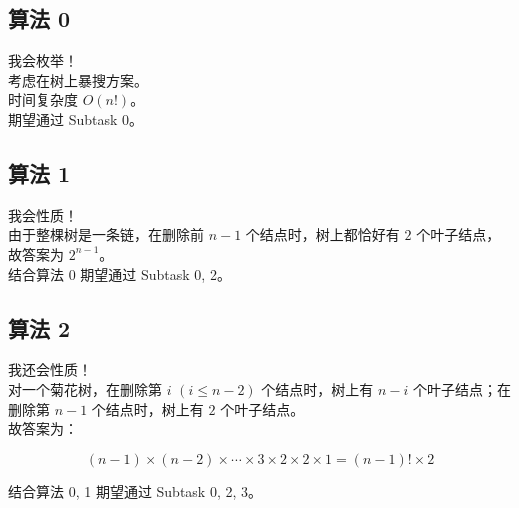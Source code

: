 \documentclass[11pt, fontset = fandol]{ctexbeamer}
\begin{document}
\subsection{算法 0}
\begin{frame}
  \pause
  我会枚举！\\
  \pause
  考虑在树上暴搜方案。\\
  \pause
  时间复杂度 $O(n!)$。\\
  \pause
  期望通过 Subtask 0。\\
\end{frame}

\subsection{算法 1}
\begin{frame}
  \pause
  我会性质！\\
  \pause
  由于整棵树是一条链，在删除前 $ n - 1 $ 个结点时，树上都恰好有 $ 2 $ 个叶子结点，故答案为 $ 2^{n - 1} $。\\
  \pause
  结合算法 0 期望通过 Subtask 0, 2。\\
\end{frame}

\subsection{算法 2}
\begin{frame}
  \pause
  我还会性质！\\
  \pause
  对一个菊花树，在删除第 $ i $ $\left(i \le n - 2\right) $ 个结点时，树上有 $ n - i $ 个叶子结点；在删除第 $ n - 1 $ 个结点时，树上有 $ 2 $ 个叶子结点。\\
  \pause
  故答案为：

  $$
  (n - 1) \times (n - 2) \times \cdots \times 3 \times 2 \times 2 \times 1 = (n - 1)! \times 2
  $$

  \pause
  结合算法 0, 1 期望通过 Subtask 0, 2, 3。\\
\end{frame}
\end{document}
